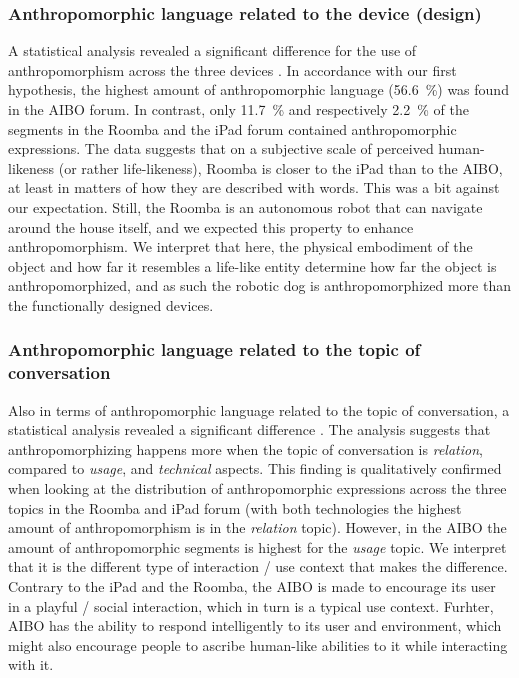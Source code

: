 \documentclass{frontiersSCNS} %
\begin{document}
\subsubsection{Anthropomorphic language related to the device (design)\\}

A statistical analysis revealed a significant difference for the use of
anthropomorphism across the three devices \citep{fink_anthropomorphic_2012}. In
accordance with our first hypothesis, the highest amount of anthropomorphic
language (56.6~\%) was found in the AIBO forum. In contrast, only 11.7~\% and
respectively 2.2~\% of the segments in the Roomba and the iPad forum contained
anthropomorphic expressions.  The data suggests that on a subjective scale of
perceived human-likeness (or rather life-likeness), Roomba is closer to the iPad
than to the AIBO, at least in matters of how they are described with words. This
was a bit against our expectation. Still, the Roomba is an autonomous robot that
can navigate around the house itself, and we expected this property to enhance
anthropomorphism. We interpret that here, the physical embodiment of the object
and how far it resembles a life-like entity determine how far the object is
anthropomorphized, and as such the robotic dog is anthropomorphized more than
the functionally designed devices.


\subsubsection{Anthropomorphic language related to the topic of conversation\\}

Also in terms of anthropomorphic language related to the topic of conversation,
a statistical analysis revealed a significant difference
\citep{fink_anthropomorphic_2012}. The analysis suggests that anthropomorphizing
happens more when the topic of conversation is \textit{relation}, compared to
\textit{usage}, and \textit{technical} aspects. This finding is qualitatively
confirmed when looking at the distribution of anthropomorphic expressions across
the three topics in the Roomba and iPad forum (with both technologies the
highest amount of anthropomorphism is in the \textit{relation} topic). However,
in the AIBO the amount of anthropomorphic segments is highest for the
\textit{usage} topic.  We interpret that it is the different type of interaction
/ use context that makes the difference. Contrary to the iPad and the Roomba,
the AIBO is made to encourage its user in a playful / social interaction, which
in turn is a typical use context. Furhter, AIBO has the ability to respond
intelligently to its user and environment, which might also encourage people to
ascribe human-like abilities to it while interacting with it.
\end{document}
